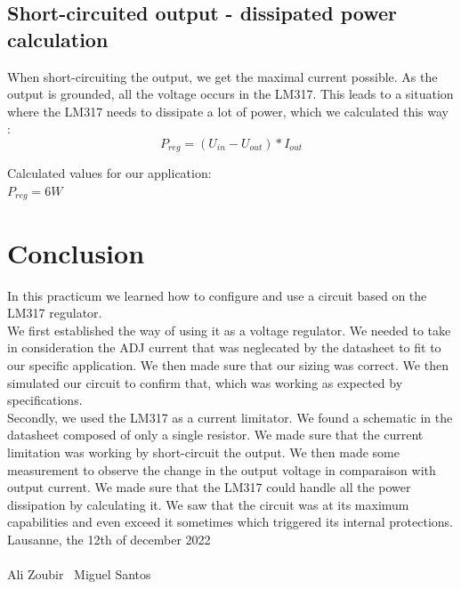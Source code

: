 \subsection{Short-circuited output - dissipated power calculation} \label{ssec:num16}
{
	When short-circuiting the output, we get the maximal current possible. As the output is grounded, all the voltage occurs in the LM317. This leads to a situation where the LM317 needs to dissipate a lot of power, which we calculated this way : \\
	
	\begin{equation}
		P_{reg} = (U_{in} - U_{out} ) * I_{out}
	\end{equation}

	Calculated values for our application:\\
	
	$ P_{reg} = 6W $ \\
}

\clearpage
\section{Conclusion}
{
In this practicum we learned how to configure and use a circuit based on the LM317 regulator. \\
We first established the way of using it as a voltage regulator. We needed to take in consideration the ADJ current that was neglecated by the datasheet to fit to our specific application. We then made sure that our sizing was correct. We then simulated our circuit to confirm that, which was working as expected by specifications.\\
Secondly, we used the LM317 as a current limitator. We found a schematic in the datasheet composed of only a single resistor. We made sure that the current limitation was working by short-circuit the output. We then made some measurement to observe the change in the output voltage in comparaison with output current. We made sure that the LM317 could handle all the power dissipation by calculating it. We saw that the circuit was at its maximum capabilities and even exceed it sometimes which triggered its internal protections.\\

Lausanne, the 12th of december 2022 \\
\\
Ali Zoubir \ Miguel Santos
}

\clearpage